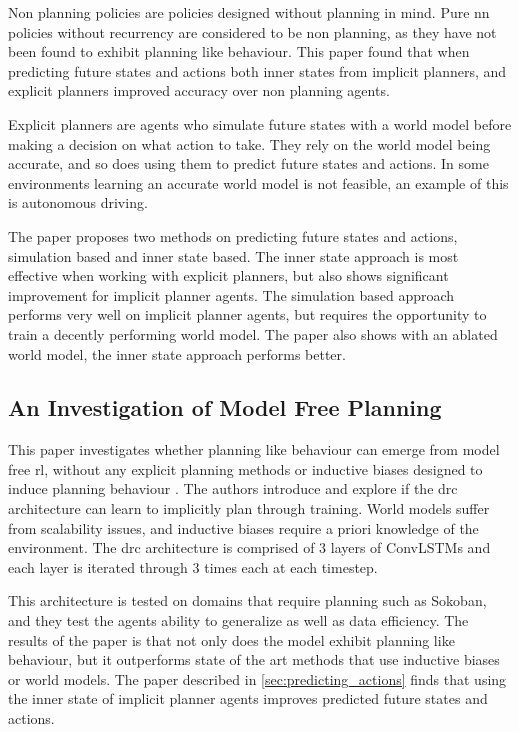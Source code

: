 \documentclass[UKenglish]{uiomasterthesis}
\begin{document}
Non planning policies are policies designed without planning in mind. Pure \ac{nn} policies without recurrency are considered to be non planning, as they have not been found to exhibit planning like behaviour. This paper found that when predicting future states and actions both inner states from implicit planners, and explicit planners improved accuracy over non planning agents.

Explicit planners are agents who simulate future states with a world model before making a decision on what action to take. They rely on the world model being accurate, and so does using them to predict future states and actions. In some environments learning an accurate world model is not feasible, an example of this is autonomous driving.

The paper proposes two methods on predicting future states and actions, simulation based and inner state based. The inner state approach is most effective when working with explicit planners, but also shows significant improvement for implicit planner agents. The simulation based approach performs very well on implicit planner agents, but requires the opportunity to train a decently performing world model. The paper also shows with an ablated world model, the inner state approach performs better.

\subsection{An Investigation of Model Free Planning}
\label{sec:impl_planning}
This paper investigates whether planning like behaviour can emerge from model free \ac{rl}, without any explicit planning methods or inductive biases designed to induce planning behaviour \cite{guez2019investigationmodelfreeplanning}. The authors introduce and explore if the \ac{drc} architecture can learn to implicitly plan through training. World models suffer from scalability issues, and inductive biases require a priori knowledge of the environment. The \ac{drc} architecture is comprised of $3$ layers of ConvLSTMs and each layer is iterated through $3$ times each at each timestep.

This architecture is tested on domains that require planning such as Sokoban, and they test the agents ability to generalize as well as data efficiency. The results of the paper is that not only does the model exhibit planning like behaviour, but it outperforms state of the art methods that use inductive biases or world models. The paper described in \cref{sec:predicting_actions} finds that using the inner state of implicit planner agents improves predicted future states and actions.
\end{document}
